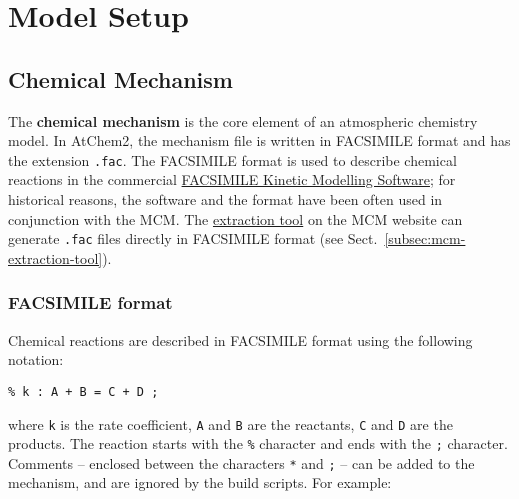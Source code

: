 %
%
%
%

\chapter{Model Setup} \label{ch:setup}

\section{Chemical Mechanism} \label{sec:chemical-mechanism}

The \textbf{chemical mechanism} is the core element of an atmospheric
chemistry model. In AtChem2, the mechanism file is written in
FACSIMILE format and has the extension \texttt{.fac}. The FACSIMILE
format is used to describe chemical reactions in the commercial
\href{http://www.mcpa-software.com/}{FACSIMILE Kinetic Modelling Software};
for historical reasons, the software and the format have been often
used in conjunction with the MCM. The
\href{http://mcm.leeds.ac.uk/MCM/extract.htt}{extraction tool} on the
MCM website can generate \texttt{.fac} files directly in FACSIMILE
format (see Sect.~\ref{subsec:mcm-extraction-tool}).

\subsection{FACSIMILE format} \label{subsec:facsimile-format}

Chemical reactions are described in FACSIMILE format using the
following notation:

\begin{verbatim}
% k : A + B = C + D ;
\end{verbatim}

where \texttt{k} is the rate coefficient, \texttt{A} and \texttt{B}
are the reactants, \texttt{C} and \texttt{D} are the products. The
reaction starts with the \texttt{\%} character and ends with the
\texttt{;} character. Comments -- enclosed between the characters
\texttt{*} and \texttt{;} -- can be added to the mechanism, and are
ignored by the build scripts. For example:

